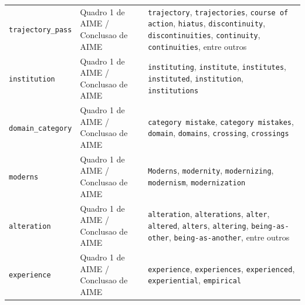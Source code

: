 \begin{longtable}{@{}p{} p{} p{}@{}}
\texttt{trajectory\_pass} & Quadro 1 de AIME / Conclusao de AIME & \texttt{trajectory}, \texttt{trajectories}, \texttt{course of action}, \texttt{hiatus}, \texttt{discontinuity}, \texttt{discontinuities}, \texttt{continuity}, \texttt{continuities}, entre outros \\
\texttt{institution} & Quadro 1 de AIME / Conclusao de AIME & \texttt{instituting}, \texttt{institute}, \texttt{institutes}, \texttt{instituted}, \texttt{institution}, \texttt{institutions} \\
\texttt{domain\_category} & Quadro 1 de AIME / Conclusao de AIME & \texttt{category mistake}, \texttt{category mistakes}, \texttt{domain}, \texttt{domains}, \texttt{crossing}, \texttt{crossings} \\
\texttt{moderns} & Quadro 1 de AIME / Conclusao de AIME & \texttt{Moderns}, \texttt{modernity}, \texttt{modernizing}, \texttt{modernism}, \texttt{modernization} \\
\texttt{alteration} & Quadro 1 de AIME / Conclusao de AIME & \texttt{alteration}, \texttt{alterations}, \texttt{alter}, \texttt{altered}, \texttt{alters}, \texttt{altering}, \texttt{being-as-other}, \texttt{being-as-another}, entre outros \\
\texttt{experience} & Quadro 1 de AIME / Conclusao de AIME & \texttt{experience}, \texttt{experiences}, \texttt{experienced}, \texttt{experiential}, \texttt{empirical} \\
\end{longtable}

